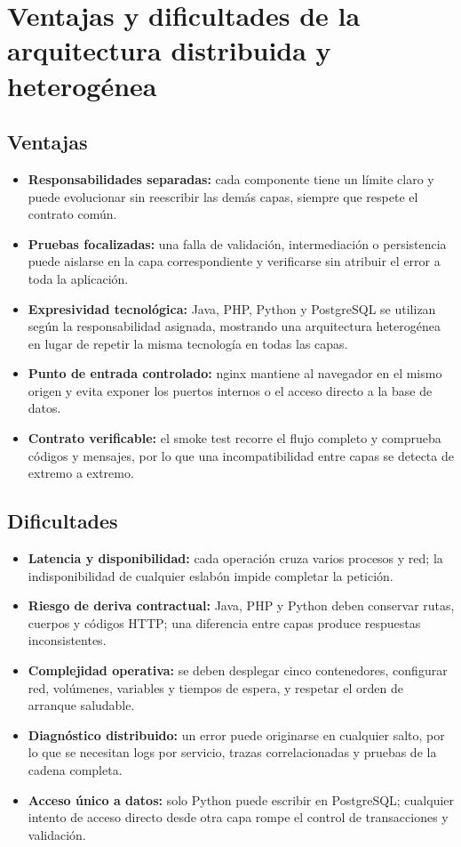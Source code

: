 \section{Ventajas y dificultades de la arquitectura distribuida y heterogénea}

\subsection{Ventajas}
\begin{itemize}
  \item \textbf{Responsabilidades separadas:} cada componente tiene un límite claro y puede evolucionar sin reescribir las demás capas, siempre que respete el contrato común.
  \item \textbf{Pruebas focalizadas:} una falla de validación, intermediación o persistencia puede aislarse en la capa correspondiente y verificarse sin atribuir el error a toda la aplicación.
  \item \textbf{Expresividad tecnológica:} Java, PHP, Python y PostgreSQL se utilizan según la responsabilidad asignada, mostrando una arquitectura heterogénea en lugar de repetir la misma tecnología en todas las capas.
  \item \textbf{Punto de entrada controlado:} nginx mantiene al navegador en el mismo origen y evita exponer los puertos internos o el acceso directo a la base de datos.
  \item \textbf{Contrato verificable:} el smoke test recorre el flujo completo y comprueba códigos y mensajes, por lo que una incompatibilidad entre capas se detecta de extremo a extremo.
\end{itemize}

\subsection{Dificultades}
\begin{itemize}
  \item \textbf{Latencia y disponibilidad:} cada operación cruza varios procesos y red; la indisponibilidad de cualquier eslabón impide completar la petición.
  \item \textbf{Riesgo de deriva contractual:} Java, PHP y Python deben conservar rutas, cuerpos y códigos HTTP; una diferencia entre capas produce respuestas inconsistentes.
  \item \textbf{Complejidad operativa:} se deben desplegar cinco contenedores, configurar red, volúmenes, variables y tiempos de espera, y respetar el orden de arranque saludable.
  \item \textbf{Diagnóstico distribuido:} un error puede originarse en cualquier salto, por lo que se necesitan logs por servicio, trazas correlacionadas y pruebas de la cadena completa.
  \item \textbf{Acceso único a datos:} solo Python puede escribir en PostgreSQL; cualquier intento de acceso directo desde otra capa rompe el control de transacciones y validación.
\end{itemize}

